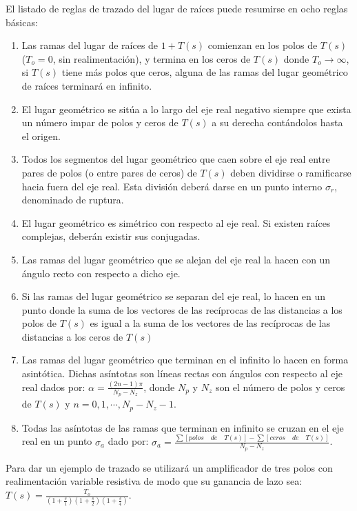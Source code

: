 El listado de reglas de trazado del lugar de raíces puede resumirse
en ocho reglas básicas:
\begin{enumerate}
	\item Las ramas del lugar de raíces de $1+T(s)$ comienzan en los
	polos de $T(s)$ ($T_o=0$, sin realimentación), y termina en los
	ceros de $T(s)$ donde $T_o \rightarrow \infty$, si $T(s)$ tiene
	más polos que ceros, alguna de las ramas del lugar geométrico de
	raíces terminará en infinito.
	\item   El lugar geométrico se sitúa a lo largo del eje real
	negativo siempre que exista un número impar de polos y ceros de $T(s)$ a su derecha contándolos hasta el origen.
	\item   Todos los segmentos del lugar geométrico que caen sobre
	el  eje real entre pares de polos (o entre pares de ceros) de
	$T(s)$ deben dividirse o ramificarse hacia fuera del eje real.
	Esta división deberá darse en un punto interno $\sigma_r$, denominado de
	ruptura.
	\item  El lugar geométrico es simétrico con respecto al eje
	real. Si existen raíces complejas, deberán existir sus
	conjugadas.
	\item Las ramas del lugar geométrico que se alejan del eje real
	la hacen con un ángulo recto con respecto a dicho eje.
	\item   Si las ramas del lugar geométrico se separan del eje
	real, lo hacen en un punto donde la suma de los vectores de las
	recíprocas de las distancias a los polos de $T(s)$ es igual a la
	suma de los vectores de las recíprocas de las distancias a los ceros de $T(s)$
	\item   Las ramas del lugar geométrico que terminan en el
	infinito lo hacen en forma asintótica. Dichas asíntotas son líneas rectas con
	ángulos con respecto al eje real dados por:
	$\alpha=\frac{\displaystyle (2n-1)\pi}{\displaystyle N_p-N_z}$, donde $N_p$ y $N_z$ son el número de
	polos y ceros de $T(s)$ y $n=0,1,\cdots,N_p-N_z-1$.
	\item   Todas las asíntotas de las ramas que terminan en
	infinito se cruzan en el eje real en un punto $\sigma_a$ dado
	por: $\sigma_a=\frac{\displaystyle \sum{[polos \quad de \quad T(s)]}-\sum{[ceros \quad
			de \quad T(s)]}}{\displaystyle N_p-N_z}$.
\end{enumerate}


Para dar un ejemplo de trazado se utilizará un amplificador de tres
polos con realimentación variable resistiva de modo que su ganancia
de lazo sea: $T(s)=\frac{\displaystyle T_o}{\displaystyle
	(1+\frac{\displaystyle s}{\displaystyle 1})(1+\frac{\displaystyle
		s}{\displaystyle 2})(1+\frac{\displaystyle s}{\displaystyle 4})}$.

